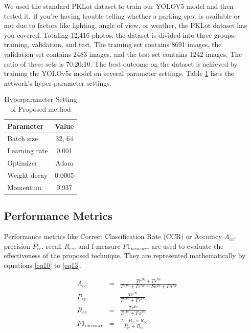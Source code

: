 \documentclass[conference]{IEEEtran}
\begin{document}
We used the standard PKLot dataset to train our YOLOV5 model and then tested it. If you're having trouble telling whether a parking spot is available or not due to factors like lighting, angle of view, or weather, the PKLot dataset has you covered. Totaling 12,416 photos, the dataset is divided into three groups: training, validation, and test. The training set contains 8691 images, the validation set contains 2483 images, and the test set contains 1242 images. The ratio of these sets is 70:20:10. The best outcome on the dataset is achieved by training the YOLOv5s model on several parameter settings. Table \ref{tab1} lists the network's hyper-parameter settings.

\begin{table}[h!]
    \centering
    \caption{Hyperparameter Setting of Proposed method}
    \label{tab1}
    \begin{tabular}{|l|c|} \hline
    \textbf{Parameter} & \textbf{Value} \\ \hline
    Batch size & 32, 64 \\ \hline
    Learning rate & 0.001 \\ \hline
    Optimizer & Adam \\ \hline
    Weight decay & 0.0005 \\ \hline
    Momentum & 0.937 \\ \hline
    \end{tabular}
\end{table}

\subsection{Performance Metrics}
Performance metrics like Correct Classification Rate (CCR) or Accuracy $A_{cc}$, precision $P_{re}$, recall $R_{ec}$, and f-measure $ F1_{measure}$ are used to evaluate the effectiveness of the proposed technique. They are represented mathematically by equations \ref{eq10} to \ref{eq13}.

\begin{eqnarray}\label{eq10}
    A_{cc} & = & \frac{Tr^{Po} + Ts^{Ne}}{Tr^{Po} + Tr^{Ne}+Fa^{Po}+Fa^{Ne}} \\
    P_{re} & = & \frac{Tr^{Po}}{Tr^{Po}+Fr^{Po}} \\
    R_{ec} & = & \frac{Tr^{Po}}{Tr^{Po}+Fa^{Ne}} \\ \label{eq13}
    F1_{measure} & = & \frac{2 \times P_{re} \times R_{ec}}{P_{re} + R_{ec}}
\end{eqnarray}
\end{document}

